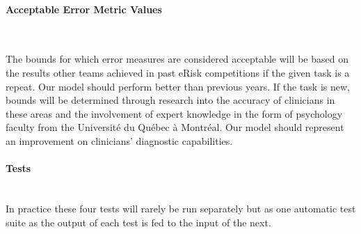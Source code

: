 \documentclass[12pt, titlepage]{article}
\newcommand{\myparagraph}[1]{\paragraph{#1}\mbox{}\\}
\begin{document}
\myparagraph{Acceptable Error Metric Values} \label{bounds}

The bounds for which error measures are considered acceptable will be based on the results other teams achieved in past eRisk competitions if the given task is a repeat. Our model should perform better than previous years. If the task is new, bounds will be determined through research into the accuracy of clinicians in these areas and the involvement of expert knowledge in the form of psychology faculty from the Université du Québec à Montréal. Our model should represent an improvement on clinicians’ diagnostic capabilities.

\myparagraph{Tests}

In practice these four tests will rarely be run separately but as one automatic test suite as the output of each test is fed to the input of the next.
\end{document}
